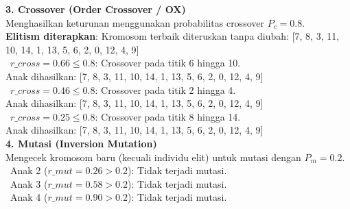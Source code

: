 \documentclass[12pt]{article}
\begin{document}
\vspace{0.5cm}
\noindent\textbf{3. Crossover (Order Crossover / OX)}\\Menghasilkan keturunan menggunakan probabilitas crossover $P_c = 0.8$.\\
\textbf{Elitism diterapkan}: Kromosom terbaik diteruskan tanpa diubah: [7, 8, 3, 11, 10, 14, 1, 13, 5, 6, 2, 0, 12, 4, 9]\\
\textbullet\ $r\_cross = 0.66 \le 0.8$: Crossover pada titik 6 hingga 10.\\ Anak dihasilkan: [7, 8, 3, 11, 10, 14, 1, 13, 5, 6, 2, 0, 12, 4, 9]\\
\textbullet\ $r\_cross = 0.46 \le 0.8$: Crossover pada titik 2 hingga 4.\\ Anak dihasilkan: [7, 8, 3, 11, 10, 14, 1, 13, 5, 6, 2, 0, 12, 4, 9]\\
\textbullet\ $r\_cross = 0.25 \le 0.8$: Crossover pada titik 8 hingga 14.\\ Anak dihasilkan: [7, 8, 3, 11, 10, 14, 1, 13, 5, 6, 2, 0, 12, 4, 9]\\

\vspace{0.5cm}
\noindent\textbf{4. Mutasi (Inversion Mutation)}\\Mengecek kromosom baru (kecuali individu elit) untuk mutasi dengan $P_m = 0.2$.\\
\textbullet\ Anak 2 ($r\_mut = 0.26 > 0.2$): Tidak terjadi mutasi.\\
\textbullet\ Anak 3 ($r\_mut = 0.58 > 0.2$): Tidak terjadi mutasi.\\
\textbullet\ Anak 4 ($r\_mut = 0.90 > 0.2$): Tidak terjadi mutasi.\\
\vspace{1cm}
\end{document}
